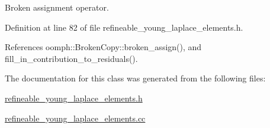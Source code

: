 Broken assignment operator. 



Definition at line 82 of file refineable\+\_\+young\+\_\+laplace\+\_\+elements.\+h.



References oomph\+::\+Broken\+Copy\+::broken\+\_\+assign(), and fill\+\_\+in\+\_\+contribution\+\_\+to\+\_\+residuals().



The documentation for this class was generated from the following files\+:\begin{DoxyCompactItemize}
\item 
\hyperlink{refineable__young__laplace__elements_8h}{refineable\+\_\+young\+\_\+laplace\+\_\+elements.\+h}\item 
\hyperlink{refineable__young__laplace__elements_8cc}{refineable\+\_\+young\+\_\+laplace\+\_\+elements.\+cc}\end{DoxyCompactItemize}
